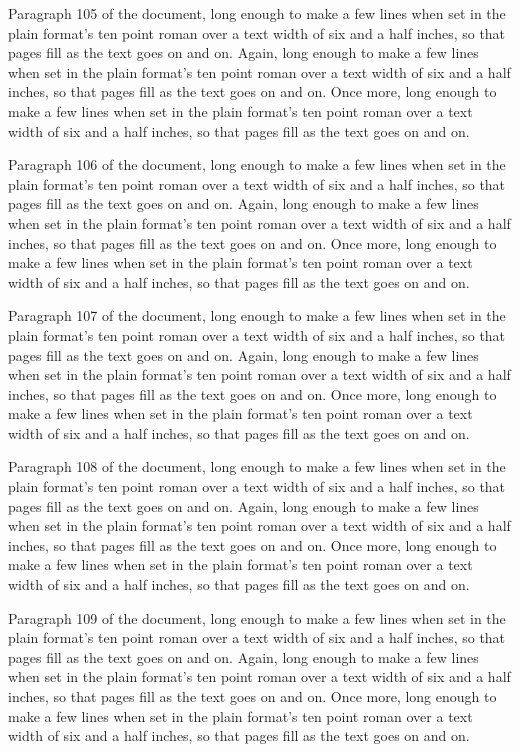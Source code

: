 Paragraph 105 of the document, long enough to make a few lines when set in the plain format's ten point roman over a text width of six and a half inches, so that pages fill as the text goes on and on. Again, long enough to make a few lines when set in the plain format's ten point roman over a text width of six and a half inches, so that pages fill as the text goes on and on. Once more, long enough to make a few lines when set in the plain format's ten point roman over a text width of six and a half inches, so that pages fill as the text goes on and on.

Paragraph 106 of the document, long enough to make a few lines when set in the plain format's ten point roman over a text width of six and a half inches, so that pages fill as the text goes on and on. Again, long enough to make a few lines when set in the plain format's ten point roman over a text width of six and a half inches, so that pages fill as the text goes on and on. Once more, long enough to make a few lines when set in the plain format's ten point roman over a text width of six and a half inches, so that pages fill as the text goes on and on.

Paragraph 107 of the document, long enough to make a few lines when set in the plain format's ten point roman over a text width of six and a half inches, so that pages fill as the text goes on and on. Again, long enough to make a few lines when set in the plain format's ten point roman over a text width of six and a half inches, so that pages fill as the text goes on and on. Once more, long enough to make a few lines when set in the plain format's ten point roman over a text width of six and a half inches, so that pages fill as the text goes on and on.

Paragraph 108 of the document, long enough to make a few lines when set in the plain format's ten point roman over a text width of six and a half inches, so that pages fill as the text goes on and on. Again, long enough to make a few lines when set in the plain format's ten point roman over a text width of six and a half inches, so that pages fill as the text goes on and on. Once more, long enough to make a few lines when set in the plain format's ten point roman over a text width of six and a half inches, so that pages fill as the text goes on and on.

Paragraph 109 of the document, long enough to make a few lines when set in the plain format's ten point roman over a text width of six and a half inches, so that pages fill as the text goes on and on. Again, long enough to make a few lines when set in the plain format's ten point roman over a text width of six and a half inches, so that pages fill as the text goes on and on. Once more, long enough to make a few lines when set in the plain format's ten point roman over a text width of six and a half inches, so that pages fill as the text goes on and on.

